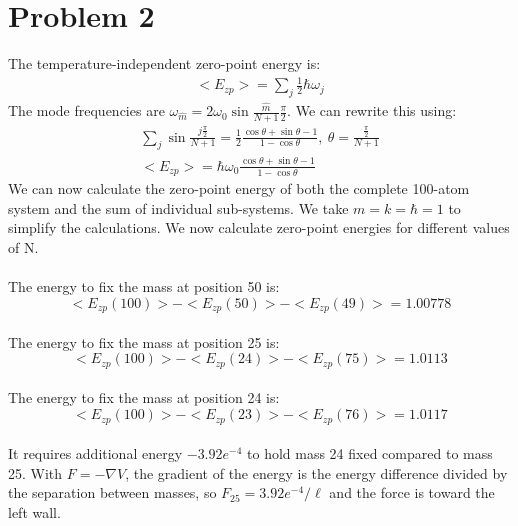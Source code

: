 \documentclass[a4paper,10pt]{article}
\numberwithin{equation}{section}
\begin{document}
\section{Problem 2}
The temperature-independent zero-point energy is:
\begin{gather}
  <E_{zp}>=\sum_j \frac{1}{2}\hbar \omega_j
\end{gather}
The mode frequencies are $\omega_{\hat{m}}=2\omega_0\sin{\frac{\hat{m}}{N+1}\frac{\pi}{2}}$. We can rewrite this using:
\begin{gather}
 \sum_j\sin\frac{j\frac{\pi}{2}}{N+1}=\frac{1}{2}\frac{\cos \theta+\sin \theta-1}{1-\cos \theta},\ \theta=\frac{\frac{\pi}{2}}{N+1}\\
 <E_{zp}>=\hbar\omega_0\frac{\cos \theta+\sin \theta-1}{1-\cos \theta}
\end{gather}
We can now calculate the zero-point energy of both the complete 100-atom system and the sum of individual sub-systems.
We take $m=k=\hbar=1$ to simplify the calculations. We now calculate zero-point energies for different values of N.\\ \\
The energy to fix the mass at position 50 is:
\begin{equation}
 <E_{zp}(100)>-<E_{zp}(50)>-<E_{zp}(49)>=1.00778
\end{equation}
\\
The energy to fix the mass at position 25 is:
\begin{equation}
 <E_{zp}(100)>-<E_{zp}(24)>-<E_{zp}(75)>=1.0113
\end{equation}
\\ 
The energy to fix the mass at position 24 is:
\begin{equation}
 <E_{zp}(100)>-<E_{zp}(23)>-<E_{zp}(76)>=1.0117
\end{equation}
\\
It requires additional energy $-3.92e^{-4}$ to hold mass 24 fixed compared to mass 25. 
With $F=-\nabla V$, the gradient of the energy is the energy difference divided by the separation between masses, so $F_{25}=3.92e^{-4}/\ell$ and the force is toward the left wall.
\end{document}
